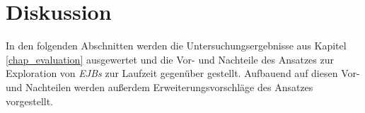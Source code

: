 \chapter{Diskussion}\label{chap_disc}
In den folgenden Abschnitten werden die Untersuchungsergebnisse aus Kapitel \ref{chap_evaluation} ausgewertet und die Vor- und Nachteile des Ansatzes zur Exploration von \emph{EJBs} zur Laufzeit gegenüber gestellt. Aufbauend auf diesen Vor- und Nachteilen werden außerdem Erweiterungsvorschläge des Ansatzes vorgestellt.


 
